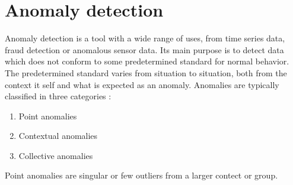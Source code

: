 \section*{Anomaly detection}
Anomaly detection is a tool with a wide range of uses, from time series data, fraud detection or anomalous sensor data. 
Its main purpose is to detect data which does not conform to some predetermined standard for normal behavior. 
The predetermined standard varies from situation to situation, both from the context it self and what is expected as an anomaly. 
Anomalies are typically classified in three categories \cite{anom_detec}:


\begin{enumerate}
    \item Point anomalies
    \item Contextual anomalies
    \item Collective anomalies
\end{enumerate}

Point anomalies are singular or few outliers from a larger contect or group. 